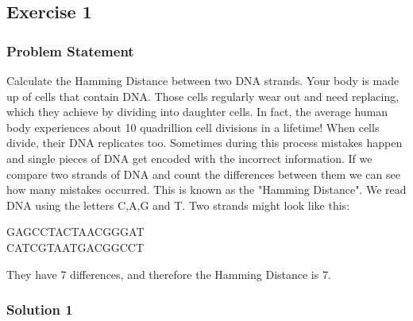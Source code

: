 \documentclass{report}
\begin{document}
    

    \pagebreak 
    \bigbreak \noindent 
    \subsection{Exercise 1}
    \bigbreak \noindent 
    \subsubsection{Problem Statement}
    \bigbreak \noindent 
    Calculate the Hamming Distance between two DNA strands.
    \bigbreak \noindent 
    Your body is made up of cells that contain DNA. Those cells regularly wear out and need replacing, which they achieve by dividing into daughter cells. In fact, the average human body experiences about 10 quadrillion cell divisions in a lifetime!
    \bigbreak \noindent 
    When cells divide, their DNA replicates too. Sometimes during this process mistakes happen and single pieces of DNA get encoded with the incorrect information. If we compare two strands of DNA and count the differences between them we can see how many mistakes occurred. This is known as the "Hamming Distance".
    \bigbreak \noindent 
    We read DNA using the letters C,A,G and T. Two strands might look like this:
    \bigbreak \noindent 
    \begin{center}
        GAGCCTACTAACGGGAT \\
        CATCGTAATGACGGCCT \\
    \end{center}
    They have 7 differences, and therefore the Hamming Distance is 7.
    \bigbreak \noindent 
    \subsubsection{Solution 1}
    \bigbreak \noindent 
\end{document}
